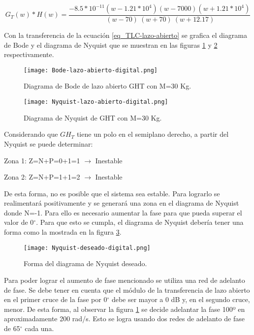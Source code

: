 \begin{equation} \label{eq_TLC-lazo-abierto} 
	G_T(w)*H(w)=\frac{-8.5*10^{-11}(w-1.21*10^4)(w-7000)(w+1.21*10^4)}{\ (w-70)\ (w+70)\ (w+12.17)} 
\end{equation} 


\noindent Con la transferencia de la ecuación \ref{eq_TLC-lazo-abierto} se  grafica el diagrama de Bode y el diagrama de Nyquist que se muestran en las figuras \ref{fig:bode-lazo-abierto-digital} y \ref{fig:nyquist-lazo-abierto-digital} respectivamente.

\begin{figure}[H]
	\centering
	\texttt{[image: Bode-lazo-abierto-digital.png]}
	\caption{Diagrama de Bode de lazo abierto GHT con M=30 Kg.}
	\label{fig:bode-lazo-abierto-digital}
\end{figure}

\begin{figure}[H]
	\centering
	\texttt{[image: Nyquist-lazo-abierto-digital.png]}
	\caption{Diagrama de Nyquist de GHT con M=30 Kg.}
	\label{fig:nyquist-lazo-abierto-digital}
\end{figure}

\noindent Considerando que ${GH}_T$ tiene un polo en el semiplano derecho, a partir del Nyquist se puede determinar:

\noindent Zona 1: Z=N+P=0+1=1 $\mathrm{\to}$ Inestable 

\noindent Zona 2: Z=N+P=1+1=2 $\mathrm{\to}$ Inestable

\noindent De esta forma, no es posible que el sistema sea estable. Para lograrlo se realimentar\'{a} positivamente y se generar\'{a} una zona en el diagrama de Nyquist donde N=-1. Para ello es necesario aumentar la fase para que pueda superar el valor de 0$\mathrm{{}^\circ}$.  Para que esto se cumpla, el diagrama de Nyquist deber\'{i}a tener una forma como la  mostrada en la figura \ref{fig:nyquist-deseado-digital}.

\begin{figure}[H]
	\centering
	\texttt{[image: Nyquist-deseado-digital.png]}
	\caption{Forma del diagrama de Nyquist deseado.}
	\label{fig:nyquist-deseado-digital}
\end{figure}

\noindent Para poder lograr el aumento de fase mencionado se utiliza una red de adelanto de fase. Se debe tener en cuenta que el m\'{o}dulo de la transferencia de lazo abierto en el primer cruce de la fase por 0$\mathrm{{}^\circ}$ debe ser mayor a 0 dB y, en el segundo cruce, menor. De esta forma, al observar la figura \ref{fig:bode-lazo-abierto-digital} se decide adelantar la fase 100º en aproximadamente 200 rad/s. Esto se logra usando dos redes de adelanto de fase de 65$\mathrm{{}^\circ}$ cada una.

